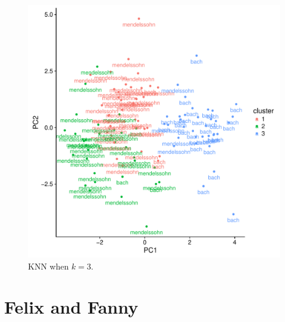 \documentclass[12pt,twoside]{reedthesis}
\theoremstyle{definition}
\theoremstyle{definition}
\theoremstyle{definition}
\theoremstyle{remark}
\begin{document}
\begin{figure}[H]
\centering
\includegraphics[scale = .7]{images/kmeans_3_b.pdf}
\caption{KNN when $k = 3$.}
\label{subd}
\end{figure}
\section{Felix and Fanny}\label{felix-and-fanny}
\end{document}
